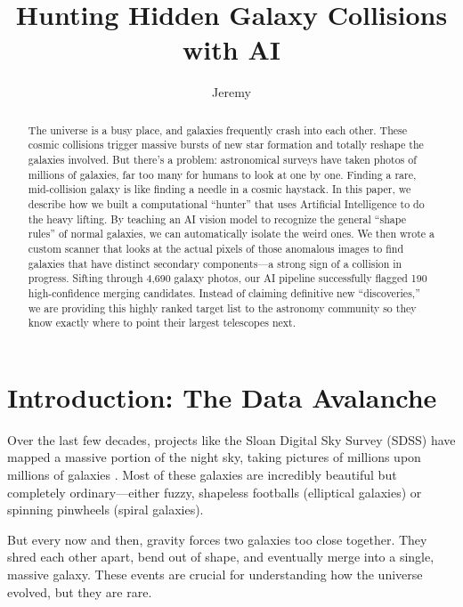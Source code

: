 \documentclass[twocolumn]{aastex631}
\begin{document}
\title{Hunting Hidden Galaxy Collisions with AI}

\author{Jeremy}

\begin{abstract}
The universe is a busy place, and galaxies frequently crash into each other. These cosmic collisions trigger massive bursts of new star formation and totally reshape the galaxies involved. But there's a problem: astronomical surveys have taken photos of millions of galaxies, far too many for humans to look at one by one. Finding a rare, mid-collision galaxy is like finding a needle in a cosmic haystack. In this paper, we describe how we built a computational ``hunter'' that uses Artificial Intelligence to do the heavy lifting. By teaching an AI vision model to recognize the general ``shape rules'' of normal galaxies, we can automatically isolate the weird ones. We then wrote a custom scanner that looks at the actual pixels of those anomalous images to find galaxies that have distinct secondary components—a strong sign of a collision in progress. Sifting through 4,690 galaxy photos, our AI pipeline successfully flagged 190 high-confidence merging candidates. Instead of claiming definitive new ``discoveries,'' we are providing this highly ranked target list to the astronomy community so they know exactly where to point their largest telescopes next.
\end{abstract}


\section{Introduction: The Data Avalanche} \label{sec:intro}

Over the last few decades, projects like the Sloan Digital Sky Survey (SDSS) have mapped a massive portion of the night sky, taking pictures of millions upon millions of galaxies \citep{york2000}. Most of these galaxies are incredibly beautiful but completely ordinary—either fuzzy, shapeless footballs (elliptical galaxies) or spinning pinwheels (spiral galaxies). 

But every now and then, gravity forces two galaxies too close together. They shred each other apart, bend out of shape, and eventually merge into a single, massive galaxy. These events are crucial for understanding how the universe evolved, but they are rare. 
\end{document}
